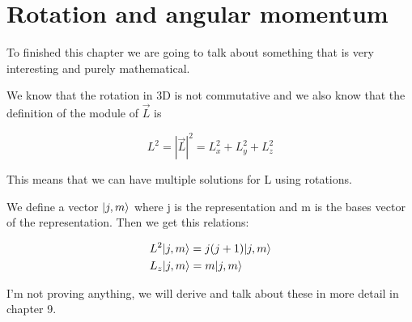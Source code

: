 \section{Rotation and angular momentum}

To finished this chapter we are going to talk about something that is very interesting and purely mathematical.

We know that the rotation in 3D is not commutative and we also know that the definition of the module of $\vec{L}$ is

\begin{equation}
    \label{module_L}
    L^2=|\Vec{L}|^2=L_{x}^2+L_{y}^2+L_{z}^2
\end{equation}

This means that we can have multiple solutions for L using rotations.

We define a vector $\lvert j,m\rangle$ where j is the representation and m is the bases vector of the representation. Then we get this relations:

\begin{equation}
\label{jm_vec}
    \begin{split}
        & L^2 \lvert j,m\rangle = j(j+1)\lvert j,m\rangle\\
        & L_z \lvert j,m\rangle = m \lvert j,m\rangle
    \end{split}
\end{equation}

I'm not proving anything, we will derive and talk about these in more detail in chapter 9.



